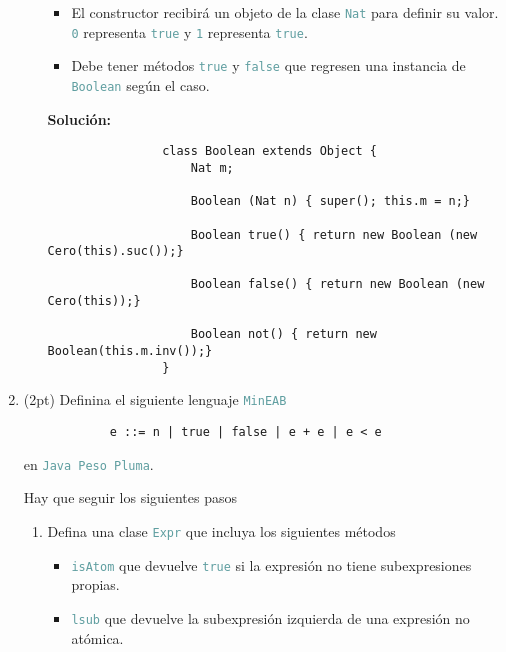 \documentclass{article}
\newcommand{\tx}[1]{\textcolor{CadetBlue} {\texttt{#1}}}
\newcommand{\tb}[1]{\textcolor{RoyalPurple} {\textbf{#1}}}
\newcommand{\pt}[1]{\textcolor{RoyalPurple}{(#1pt)}}
\begin{document}
\begin{enumerate}
\begin{enumerate}
\begin{itemize}
                \item El constructor recibirá un objeto de la clase \tx{Nat}
                para definir su valor. \tx{0} representa \tx{true} y \tx{1}
                representa \tx{true}.

                \item Debe tener métodos \tx{true} y \tx{false} que regresen una
                instancia de \tx{Boolean} según el caso.
            \end{itemize} 

            \tb{Solución:}
            \begin{verbatim}
                class Boolean extends Object {
                    Nat m;

                    Boolean (Nat n) { super(); this.m = n;}

                    Boolean true() { return new Boolean (new Cero(this).suc());}

                    Boolean false() { return new Boolean (new Cero(this));}

                    Boolean not() { return new Boolean(this.m.inv());}
                }
            \end{verbatim}
        \end{enumerate}
        
        \item \pt{2} Definina el siguiente lenguaje \tx{MinEAB}

        \begin{verbatim}
            e ::= n | true | false | e + e | e < e
        \end{verbatim}

        en \tx{Java Peso Pluma}.

        Hay que seguir los siguientes pasos

        \begin{enumerate}
            \item Defina una clase \tx{Expr} que incluya los siguientes métodos

            \begin{itemize}
                \item \tx{isAtom} que devuelve \tx{true} si la expresión no
                tiene subexpresiones propias.

                \item \tx{lsub} que devuelve la subexpresión izquierda de una
                expresión no atómica.


\end{itemize}
\end{enumerate}
\end{enumerate}
\end{document}
